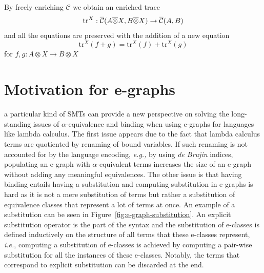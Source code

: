 \documentclass[acmsmall, screen, nonacm]{acmart}
\begin{document}
By freely enriching $\mathcal{C}$ we obtain an enriched trace
\[
\text{tr}^{X} : {\overline{\mathcal{C}}}(A \overline{\otimes} X, B \overline{\otimes} X) \to {\overline{\mathcal{C}}}(A,B)
\]
and all the equations are preserved with the addition of a new equation
\[
  \text{tr}^{X}(f + g) = \text{tr}^{X}(f) + \text{tr}^{X}(g)
\]
for $f,g : A \overline{\otimes} X \to B \overline{\otimes} X$


\section{Motivation for e-graphs}

a particular kind of SMTs can provide a new perspective on solving the long-standing issues of $\alpha$-equivalence and binding when using e-graphs for languages like lambda calculus.
The first issue appears due to the fact that lambda calculus terms are quotiented by renaming of bound variables.
If such renaming is not accounted for by the language encoding, \textit{e.g.,} by using \textit{de Brujin} indices, populating an e-graph with $\alpha$-equivalent terms increases the size of an e-graph without adding any meaningful equivalences.
The other issue is that having binding entails having a substitution and computing substitution in e-graphs is hard as it is not a mere substitution of terms but rather a substitution of equivalence classes that represent a lot of terms at once.
An example of a substitution can be seen in Figure~\ref{fig:e-graph-substitution}. An explicit substitution operator is the part of the syntax and the substitution of e-classes is defined inductively on the structure of all terms that these e-classes represent, \textit{i.e.}, computing a substitution of e-classes is achieved by computing a pair-wise substitution for all the instances of these e-classes.
Notably, the terms that correspond to explicit substitution can be discarded at the end.
\end{document}
